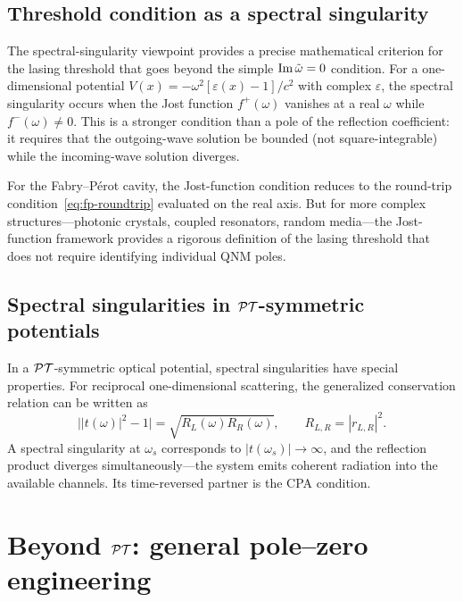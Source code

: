 \subsection{Threshold condition as a spectral singularity}
\label{ssec:spectral-threshold}

The spectral-singularity viewpoint provides a precise mathematical
criterion for the lasing threshold that goes beyond the simple
$\operatorname{Im}\tilde{\omega} = 0$ condition. For a one-dimensional potential
$V(x) = -\omega^2[\varepsilon(x) - 1]/c^2$ with complex $\varepsilon$,
the spectral singularity occurs when the Jost function $f^+(\omega)$
vanishes at a real $\omega$ while $f^-(\omega) \neq 0$. This is a
stronger condition than a pole of the reflection coefficient: it
requires that the outgoing-wave solution be bounded (not
square-integrable) while the incoming-wave solution diverges.

For the Fabry--P\'erot cavity, the Jost-function condition reduces to
the round-trip condition~\eqref{eq:fp-roundtrip} evaluated on the real
axis. But for more complex structures---photonic crystals, coupled
resonators, random media---the Jost-function framework provides a
rigorous definition of the lasing threshold that does not require
identifying individual QNM poles.

\subsection{Spectral singularities in $\mathcal{PT}$-symmetric potentials}
\label{ssec:spectral-sing-pt}

In a $\mathcal{PT}$-symmetric optical potential, spectral singularities have
special properties. For reciprocal one-dimensional scattering, the
generalized conservation relation can be written as
\begin{equation}
 \bigl||t(\omega)|^2-1\bigr|=\sqrt{R_L(\omega)R_R(\omega)},
 \qquad R_{L,R}=|r_{L,R}|^2 .
 \label{eq:pt-generalized-unitarity}
\end{equation}
A spectral singularity at $\omega_s$ corresponds to
 $|t(\omega_s)| \to \infty$, and the reflection product diverges
simultaneously---the system emits coherent radiation into the available
channels. Its time-reversed partner is the CPA condition.


\section{Beyond $\mathcal{PT}$: general pole--zero engineering}
\label{sec:pole-zero-engineering}

